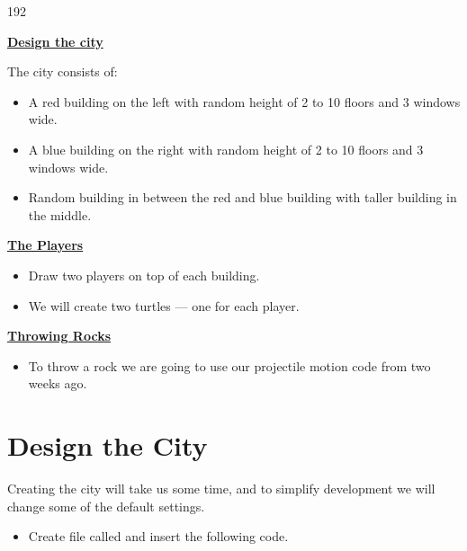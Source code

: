 \documentclass{coderdojo}
\newcommand\contentsitem[2]{
	\item \hyperref[#1]{\color{section}\bfseries #2}
}
\newcommand\TODO[1]{
\begin{itemize}
\item[\todoSymbol] \color{todo} #1
\end{itemize}}
\begin{document}
\begin{dingautolist}{192}

\contentsitem{city}{Design the city}

The city consists of:
\begin{itemize}
\item A red building on the left with random height of 2 to 10 floors and 3 windows wide.
\item A blue building on the right with random height of 2 to 10 floors and 3 windows wide.
\item Random building in between the red and blue building with taller building in the middle.
\end{itemize}


\contentsitem{physics}{The Players}

\begin{itemize}
\item
Draw two players on top of each building.
\item
We will create two turtles --- one for each player.

\end{itemize}


\contentsitem{physics}{Throwing Rocks}

\begin{itemize}
\item
To throw a rock we are going to use our projectile motion code from two weeks ago.
\end{itemize}


\end{dingautolist}



\section{Design the City}\label{sec:city}

Creating the city will take us some time, and to simplify development we will change some of the default  settings.

\TODO{Create file called  and insert the following code.}

\end{document}

